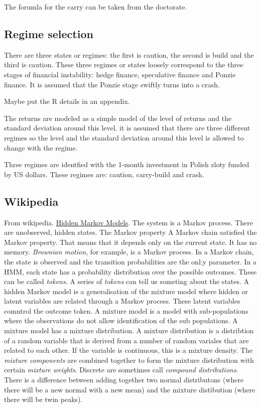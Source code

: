 \documentclass[12pt, a4paper, oneside]{article} %
\begin{document}
The forumla for the carry can be taken from the doctorate. 

\subsection{Regime selection}
There are three states or regimes: the first is caution, the second is build and the third is caution. These three regimes or states loosely correspond to the three stages of financial instability: hedge finance, speculative finance and Ponzie finance. It is assumed that the Ponzie stage swiftly turns into a crash. 

Maybe put the R details in an appendix. 

The returns are modeled as a simple model of the level of returns and the standard deviation around this level.  it is assumed that there are three different regimes so the level and the standard deviation around this level is allowed to change with the regime.  

Three regimes are identfied with the 1-month investment in Polish zloty funded by US dollars.  These regimes are:  caution, carry-build and crash. 

\subsection{Wikipedia}
From wikipedia.  \href{http://en.wikipedia.org/wiki/Hidden_Markov_model}{Hidden Markov Models}.  The system is a Markov process.  There are unobserved, hidden states.  The Markov property A Markov chain satisfied the Markov property.  That means that it depends only on the current state.  It has no memory. \emph{Brownian motion}, for example, is a Markov process. In a Markov chain, the state is observed and the transition probabilities are the onl;y parameter.  In a HMM, each state has a probability distribution over the possible outcomes.  These can be called \emph{tokens}.  A series of \emph{tokens} can tell us someting about the states.   A hidden Markov model is a generalisation of the mixture model where hidden or latent variables are related through a Markov process. These latent variables comntrol the outcome token. A mixture model is a model with sub-populations where the observations do not allow identification of the sub populations.  A mixture model has a mixture distribution. A mixture distribution is a distribtion of a random variable that is derived from a number of random variales that are related to each other. If the variable is continuous, this is a mixture density.  The \emph{mixture components} are combined together to form the mixture distribution with certain \emph{mixture weights}.  Discrete are sometimes call \emph{compound distributions}.  There is a difference between adding together two normal distributons (where there will be a new normal with a new mean) and the mixture distibution (where there will be twin peaks).  
\end{document}
